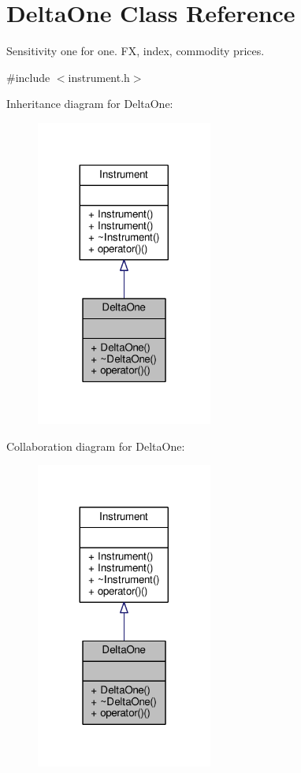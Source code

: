 \hypertarget{classDeltaOne}{}\section{Delta\+One Class Reference}
\label{classDeltaOne}


Sensitivity one for one. FX, index, commodity prices.  




{\ttfamily \#include $<$instrument.\+h$>$}



Inheritance diagram for Delta\+One\+:
\nopagebreak
\begin{figure}[H]
\begin{center}
\leavevmode
\includegraphics[width=164pt]{classDeltaOne__inherit__graph}
\end{center}
\end{figure}


Collaboration diagram for Delta\+One\+:
\nopagebreak
\begin{figure}[H]
\begin{center}
\leavevmode
\includegraphics[width=164pt]{classDeltaOne__coll__graph}
\end{center}
\end{figure}
